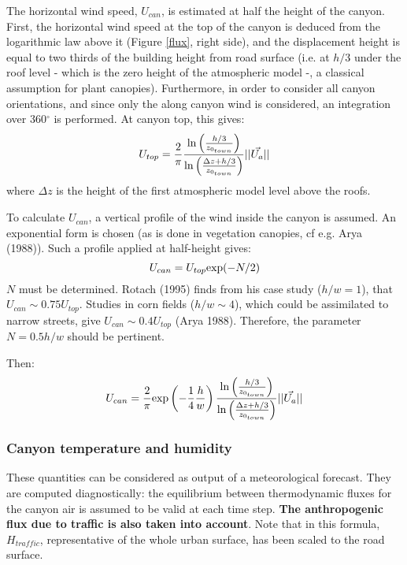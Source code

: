 The horizontal wind speed, $U_{can}$, is estimated at half the height of the canyon.
First, the horizontal wind speed at the top of the canyon is deduced from
the logarithmic law above it (Figure \ref{flux}, right side), and
the displacement height is equal to two thirds of the building height
from road surface (i.e. at $h/3$ under the roof level -
which is the zero height of the atmospheric model -, a classical
assumption for plant canopies).
Furthermore, in order
to consider all canyon orientations, and since only the along canyon wind is
considered, an integration over 360$^\circ$ is performed. At canyon
top, this gives:
\begin{displaymath}
U_{top} = \frac{2}{\pi} \frac{{\rm ln}\left(\frac{h/3}{z_{0_{town}}}\right)}
{{\rm ln}\left(\frac{\Delta z+h/3}{z_{0_{town}}}\right)} ||\vec{U_a}||
\end{displaymath}
where $\Delta z$ is the height of the first atmospheric model level above
the roofs.

To calculate $U_{can}$, a vertical profile of the wind inside the canyon
is assumed.
An exponential form is chosen (as is done in vegetation canopies,
cf e.g. Arya (1988)\nocite{Arya1988}). Such a profile applied at half-height
gives:
\begin{displaymath}
U_{can} = U_{top} {\rm exp}(-N/2)
\end{displaymath}
$N$ must be determined.
Rotach (1995)  finds from his case study ($h/w=1$), that
$U_{can} \sim 0.75 U_{top}$.
Studies in corn fields ($h/w\sim 4$), which could be assimilated to narrow
streets, give $U_{can} \sim 0.4 U_{top}$ (Arya 1988).
Therefore, the parameter $N= 0.5 h/w$ should be pertinent.

Then:
\begin{equation}
U_{can} = \frac{2}{\pi} {\rm exp}\left(-\frac{1}{4}\frac{h}{w}\right) 
\frac{{\rm ln}\left(\frac{h/3}{z_{0_{town}}}\right)}
{{\rm ln}\left(\frac{\Delta z+h/3}{z_{0_{town}}}\right)} ||\vec{U_a}||
\end{equation}


\subsubsection{Canyon temperature and humidity}

These quantities can be considered as output of a meteorological forecast.
They are computed diagnostically: the equilibrium between thermodynamic
fluxes for the canyon air is assumed to be valid at each time step.
{\bf The anthropogenic flux due to traffic is also taken into account}.
Note that in this formula, $H_{traffic}$, representative of
the whole urban surface, has been scaled to the road surface.


